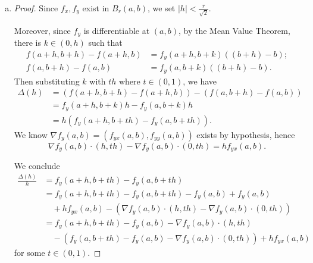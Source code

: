 \begin{Exercise}
\begin{enumerate}[a)]
\item
\begin{proof}
Since $f_x, f_y$ exist in $B_r(a,b)$, we set $|h|<\frac{r}{\sqrt{2}}$.

Moreover, since $f_y$ is differentiable at $(a,b)$, by the Mean Value Theorem, there is $k\in(0,h)$ such that
\begin{align*}
f(a+h,b+h)-f(a+h,b) &= f_y(a+h,b+k) ((b+h)-b); \\
f(a,b+h)-f(a,b) &= f_y(a,b+k) ((b+h)-b).
\end{align*}
Then substituting $k$ with $t h$ where $t\in(0,1)$, we have
\begin{align*}
\Delta(h)
&= (f(a+h,b+h)-f(a+h,b)) - (f(a,b+h)-f(a,b)) \\
&= f_y(a+h, b+k) h - f_y(a,b+k) h \\
&= h\left( f_y(a+h,b+t h)-f_y(a,b+t h) \right).
\end{align*}
We know $\nabla f_y(a,b) = (f_{y x}(a,b), f_{y y}(a,b))$ exists by hypothesis, hence
$$
\nabla f_y(a,b)\cdot(h,t h)-\nabla f_y(a,b)\cdot(0,t h)
= h f_{y x}(a,b).
$$

We conclude
\begin{align*}
\frac{\Delta(h)}{h}
&= f_y(a+h,b+t h)-f_y(a,b+t h) \\
&= f_y(a+h,b+t h)-f_y(a,b+t h) - f_y(a,b) + f_y(a,b) \\
&\quad + h f_{y x}(a,b) - \left( \nabla f_y(a,b)\cdot(h,t h)-\nabla f_y(a,b)\cdot(0,t h) \right) \\
&= f_y(a+h,b+ t h)-f_y(a,b)-\nabla f_y(a,b)\cdot(h,t h)\\
&\quad -\left( f_y(a,b+t h)-f_y(a,b)-\nabla f_y(a,b)\cdot(0,t h) \right) + h f_{y x}(a,b)
\end{align*}
for some $t\in(0,1)$.
\end{proof}


\end{enumerate}
\end{Exercise}
